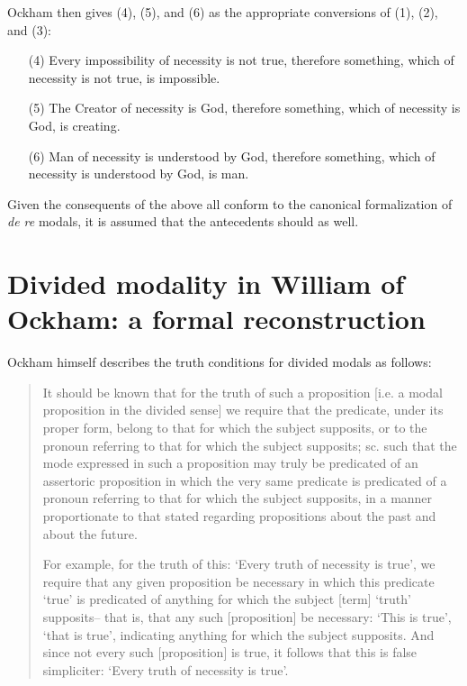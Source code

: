 	Ockham then gives (4), (5), and (6) as the appropriate conversions of (1), (2), and (3):
	
	\begin{enumerate}
		\item[(4)]	Every impossibility of necessity is not true, therefore something, which of necessity is not true, is impossible.
		\item[(5)]	The Creator of necessity is God, therefore something, which of necessity is God, is creating.
		\item[(6)]	Man of necessity is understood by God, therefore something, which of necessity is understood by God, is man. \cite[II. 24, p. 329]{OckhamSL}
	\end{enumerate}
	
	Given the consequents of the above all conform to the canonical formalization of \textit{de re} modals, it is assumed that the antecedents should as well.
	\section[Divided modality in William of Ockham]{Divided modality in William of Ockham: a formal reconstruction}
	Ockham himself describes the truth conditions for divided modals as follows:
	
	\begin{quote}
		It should be known that for the truth of such a proposition [i.e. a modal proposition in the divided sense] we require that the predicate, under its proper form, belong to that for which the subject supposits, or to the pronoun referring to that for which the subject supposits; sc. such that the mode expressed in such a proposition may truly be predicated of an assertoric proposition in which the very same predicate is predicated of a pronoun referring to that for which the subject supposits, in a manner proportionate to that stated regarding propositions about the past and about the future. 
		
		For example, for the truth of this: `Every truth of necessity is true', we require that any given proposition be necessary in which this predicate `true' is predicated of anything for which the subject [term] `truth' supposits– that is, that any such [proposition] be necessary:  `This is true', `that is true', indicating anything for which the subject supposits. And since not every such [proposition] is true, it follows that this is false simpliciter: `Every truth of necessity is true'. \cite[II. 10, p. 276]{OckhamSL} 
	\end{quote}
	
